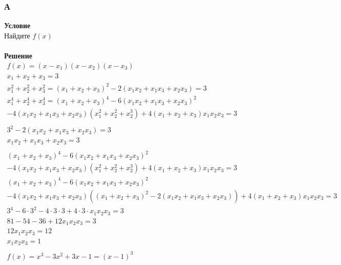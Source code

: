 	\subsubsection*{\textbf{А}}
	\textbf{Условие}\\
	Найдите $f(x)$\\
	\\
	\textbf{Решение}\\
	\begin{gather*}
		f(x) = (x - x_1)(x - x_2)(x - x_3)\\
		x_1 + x_2 + x_3 = 3\\
		x_1^{2} + x_2^{2} + x_3^{2} = (x_1 + x_2 + x_3)^2 - 2(x_1 x_2 + x_1 x_3 + x_2 x_3) = 3\\
		x_1^{4} + x_2^{4} + x_3^{4} = (x_1 + x_2 + x_3)^4 - 6(x_1 x_2 + x_1 x_3 + x_2 x_3)^{2}\\
		- 4(x_1 x_2 + x_1 x_3 + x_2 x_3)(x_1^2 + x_2^2 + x_2^3) + 4(x_1 + x_2 + x_3)x_1x_2x_3 = 3\\
		\\
		3^2 - 2(x_1 x_2 + x_1 x_3 + x_2 x_3) = 3\\
		x_1 x_2 + x_1 x_3 + x_2 x_3 = 3\\
		\\
		(x_1 + x_2 + x_3)^4 - 6(x_1 x_2 + x_1 x_3 + x_2 x_3)^{2}\\
		- 4(x_1 x_2 + x_1 x_3 + x_2 x_3)(x_1^2 + x_2^2 + x_2^3) + 4(x_1 + x_2 + x_3)x_1x_2x_3 = 3\\
		(x_1 + x_2 + x_3)^4 - 6(x_1 x_2 + x_1 x_3 + x_2 x_3)^{2}\\
		- 4(x_1 x_2 + x_1 x_3 + x_2 x_3)((x_1 + x_2 + x_3)^2 - 2(x_1 x_2 + x_1 x_3 + x_2 x_3)) + 4(x_1 + x_2 + x_3)x_1x_2x_3 = 3\\
		3^4 - 6 \cdot 3^{2} - 4 \cdot 3 \cdot 3 + 4 \cdot 3  \cdot x_1x_2x_3 = 3\\
		81 - 54 - 36 + 12 x_1x_2x_3 = 3\\
		12 x_1x_2x_3 = 12\\
		x_1x_2x_3 = 1\\
		\\
		f(x) = x^3 - 3x^2 + 3x - 1 = (x-1)^{3}
	\end{gather*}
	
